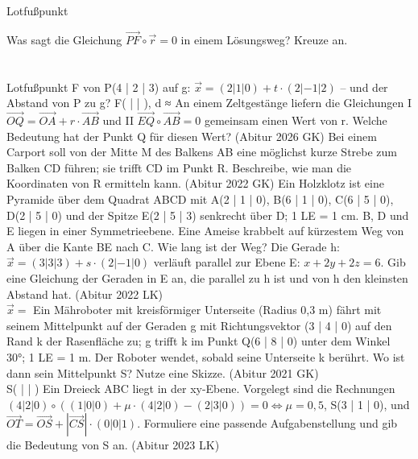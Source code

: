 \setcounter{aufgabe}{13}

\begin{aufgabe}{Lotfußpunkt}
\begin{teile}
\teil Was sagt die Gleichung $\overrightarrow{PF} \circ \vec r = 0$ in einem Lösungsweg? Kreuze an. \\  \\  \\ 
\teil Lotfußpunkt F von P(4 | 2 | 3) auf g: $\vec x = (2 | 1 | 0) + t \cdot (2 | -1 | 2)$ – und der Abstand von P zu g? F( \leerfeld | \leerfeld | \leerfeld ), d ≈ \leerfeld
\teil An einem Zeltgestänge liefern die Gleichungen I $\overrightarrow{OQ} = \overrightarrow{OA} + r \cdot \overrightarrow{AB}$ und II $\overrightarrow{EQ} \circ \overrightarrow{AB} = 0$ gemeinsam einen Wert von r. Welche Bedeutung hat der Punkt Q für diesen Wert? \hfill (Abitur 2026 GK)
\teil Bei einem Carport soll von der Mitte M des Balkens AB eine möglichst kurze Strebe zum Balken CD führen; sie trifft CD im Punkt R. Beschreibe, wie man die Koordinaten von R ermitteln kann. \hfill (Abitur 2022 GK)
\teil Ein Holzklotz ist eine Pyramide über dem Quadrat ABCD mit A(2 | 1 | 0), B(6 | 1 | 0), C(6 | 5 | 0), D(2 | 5 | 0) und der Spitze E(2 | 5 | 3) senkrecht über D; 1 LE = 1 cm. B, D und E liegen in einer Symmetrieebene. Eine Ameise krabbelt auf kürzestem Weg von A über die Kante BE nach C. Wie lang ist der Weg? \leerfeld[cm]
\teil Die Gerade h: $\vec x = (3 | 3 | 3) + s \cdot (2 | -1 | 0)$ verläuft parallel zur Ebene E: $x + 2y + 2z = 6$. Gib eine Gleichung der Geraden in E an, die parallel zu h ist und von h den kleinsten Abstand hat. \hfill (Abitur 2022 LK) \\ $\vec x = $ \leerfeld
\teil Ein Mähroboter mit kreisförmiger Unterseite (Radius 0,3 m) fährt mit seinem Mittelpunkt auf der Geraden g mit Richtungsvektor (3 | 4 | 0) auf den Rand k der Rasenfläche zu; g trifft k im Punkt Q(6 | 8 | 0) unter dem Winkel 30°; 1 LE = 1 m. Der Roboter wendet, sobald seine Unterseite k berührt. Wo ist dann sein Mittelpunkt S? Nutze eine Skizze. \hfill (Abitur 2021 GK) \\ S( \leerfeld | \leerfeld | \leerfeld )
\teil Ein Dreieck ABC liegt in der xy-Ebene. Vorgelegt sind die Rechnungen $(4 | 2 | 0) \circ ((1 | 0 | 0) + \mu \cdot (4 | 2 | 0) - (2 | 3 | 0)) = 0 \Leftrightarrow \mu = 0{,}5$, S(3 | 1 | 0), und $\overrightarrow{OT} = \overrightarrow{OS} + |\overrightarrow{CS}| \cdot (0 | 0 | 1)$. Formuliere eine passende Aufgabenstellung und gib die Bedeutung von S an. \hfill (Abitur 2023 LK)
\end{teile}
\end{aufgabe}
